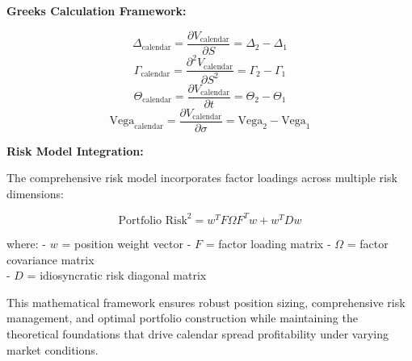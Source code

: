 \documentclass[
  american,
  11pt,
  11pt,
  letterpaper,
  onecolumn]{article}
\begin{document}
\textbf{Greeks Calculation Framework:}

\[\Delta_{\text{calendar}} = \frac{\partial V_{\text{calendar}}}{\partial S} = \Delta_2 - \Delta_1\]
\[\Gamma_{\text{calendar}} = \frac{\partial^2 V_{\text{calendar}}}{\partial S^2} = \Gamma_2 - \Gamma_1\]
\[\Theta_{\text{calendar}} = \frac{\partial V_{\text{calendar}}}{\partial t} = \Theta_2 - \Theta_1\]
\[\text{Vega}_{\text{calendar}} = \frac{\partial V_{\text{calendar}}}{\partial \sigma} = \text{Vega}_2 - \text{Vega}_1\]

\textbf{Risk Model Integration:}

The comprehensive risk model incorporates factor loadings across
multiple risk dimensions:

\[\text{Portfolio Risk}^2 = w^T F \Omega F^T w + w^T D w\]

where: - \(w\) = position weight vector - \(F\) = factor loading matrix
- \(\Omega\) = factor covariance matrix\\
- \(D\) = idiosyncratic risk diagonal matrix

This mathematical framework ensures robust position sizing,
comprehensive risk management, and optimal portfolio construction while
maintaining the theoretical foundations that drive calendar spread
profitability under varying market conditions.


\printbibliography
\end{document}
